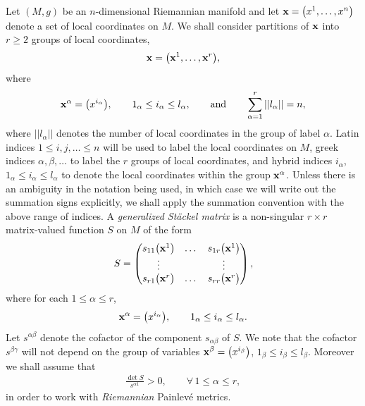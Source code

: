 Let $(M,g)$ be an $n$-dimensional Riemannian manifold and let ${\bf x}=\big(x^{1},\dots , x^{n}\big)$ denote a set of local coordinates on $M$. We shall consider partitions of ${\bf x}$ into $r\geq 2$ groups of local coordinates,
\[
{\bf x}=\big({{\bf x}^{1}},\dots,{{\bf x}^{r}}\big),
\]
where
\[
{\bf {x}}^{\alpha}=\big(x^{i_{\alpha}}\big),\qquad 1_{\alpha}\leq i_{\alpha} \leq l_{\alpha},\qquad \text{and}\qquad \sum_{\alpha=1}^{r}||l_{\alpha}||=n,
\]
where $||l_{\alpha}||$ denotes the number of local coordinates in the group of label $\alpha$. Latin indices $1\leq i,j,\ldots \leq n$ will be used to label the local coordinates on $M$, greek indices $\alpha,\beta,\dots$ to label the $r$ groups of local coordinates, and hybrid indices $i_{\alpha}$, $1_{\alpha} \leq i_{\alpha}\leq l_{\alpha}$ to denote the local coordinates within the group $\bf{x^{\alpha}}$. Unless there is an ambiguity in the notation being used, in which case we will write out the summation signs explicitly, we shall apply the summation convention with the above range of indices.
A {\em generalized St\"ackel matrix} is a non-singular $r\times r$ matrix-valued function $S$ on $M$ of the form
\begin{gather}\label{genStackelmat}
S=\left(
\begin{matrix}
s_{11}\big({{\bf x}^{1}}\big)&\dots&s_{1r}\big({{\bf x}^{1}}\big) \\
\vdots& & \vdots \\
s_{r1}\big({{\bf x}^{r}}\big)&\dots&s_{rr}\big({\bf x}^{r}\big)
\end{matrix}
\right),
\end{gather}
where for each $1\leq \alpha \leq r$,
\[
{\bf x}^{\alpha}=\big(x^{i_{\alpha}}\big),\qquad 1_{\alpha}\leq i_{\alpha} \leq l_{\alpha}.
\]
Let $s^{\alpha \beta}$ denote the cofactor of the component $s_{\alpha \beta}$ of $S$. We note that the cofactor $s^{\beta \gamma}$ will not depend on the group of variables ${\bf x}^{\beta}=\big(x^{i_{\beta}}\big)$, $1_{\beta}\leq i_{\beta} \leq l_{\beta}$. Moreover we shall assume that
\begin{gather} \label{StackelPositiveness}
\frac{\det S}{s^{\alpha 1}} > 0, \qquad \forall\, 1\leq \alpha \leq r ,
\end{gather}
in order to work with {\emph{Riemannian}} Painlev\'e metrics.

